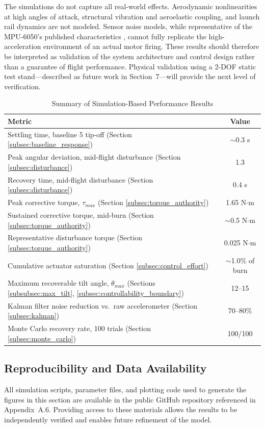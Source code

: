 The simulations do not capture all real-world effects. Aerodynamic nonlinearities at high angles
of attack, structural vibration and aeroelastic coupling, and launch rail dynamics are not modeled.
Sensor noise models, while representative of the MPU-6050's published characteristics
\cite{invensense_mpu6050}, cannot fully replicate the high-acceleration environment of an actual
motor firing. These results should therefore be interpreted as validation of the system architecture
and control design rather than a guarantee of flight performance. Physical validation using a
2-DOF static test stand---described as future work in Section~7---will provide the next level of
verification.


\begin{table}[h]
\centering
\caption{Summary of Simulation-Based Performance Results}
\label{tab:results-summary}
\begin{tabular}{lc}
\toprule
Metric & Value \\
\midrule
Settling time, baseline 5\degree{} tip-off (Section \ref{subsec:baseline_response}) & $\sim$0.3 s \\
Peak angular deviation, mid-flight disturbance (Section \ref{subsec:disturbance}) & 1.3\degree{} \\
Recovery time, mid-flight disturbance (Section \ref{subsec:disturbance}) & 0.4 s \\
Peak corrective torque, $\tau_{max}$ (Section \ref{subsec:torque_authority}) & 1.65 N$\cdot$m \\
Sustained corrective torque, mid-burn (Section \ref{subsec:torque_authority}) & $\sim$0.5 N$\cdot$m \\
Representative disturbance torque (Section \ref{subsec:torque_authority}) & 0.025 N$\cdot$m \\
Cumulative actuator saturation (Section \ref{subsec:control_effort}) & $\sim$1.0\% of burn \\
Maximum recoverable tilt angle, $\theta_{max}$ (Sections \ref{subsubsec:max_tilt}, \ref{subsec:controllability_boundary}) & 12\degree{}--15\degree{} \\
Kalman filter noise reduction vs.\ raw accelerometer (Section \ref{subsec:kalman}) & 70--80\% \\
Monte Carlo recovery rate, 100 trials (Section \ref{subsec:monte_carlo}) & 100/100 \\
\bottomrule
\end{tabular}
\end{table}

\subsection{Reproducibility and Data Availability}
\label{subsec:reproducibility}

All simulation scripts, parameter files, and plotting code used to generate the figures in this
section are available in the public GitHub repository referenced in Appendix~A.6. Providing access
to these materials allows the results to be independently verified and enables future refinement of
the model.
